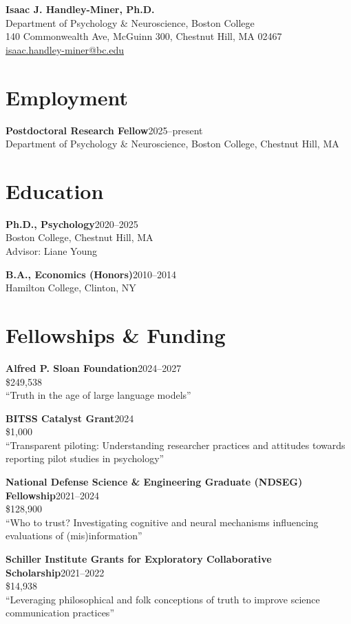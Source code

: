 \documentclass[11pt, letterpaper]{article}
\newcommand{\cventry}[3]{%
    \textbf{#1}\hfill #2\\
    {\color{mutedgray}#3}\par\vspace{0.3em}%
}
\newcommand{\cventrynote}[4]{%
    \textbf{#1}\hfill #2\\
    {\color{mutedgray}#3}\\
    {\small\color{mutedgray}#4}\par\vspace{0.3em}%
}
\begin{document}
\begin{center}
    {\LARGE\bfseries Isaac J. Handley-Miner, Ph.D.}\\[0.4em]
    {\color{mutedgray}
    Department of Psychology \& Neuroscience, Boston College\\
    140 Commonwealth Ave, McGuinn 300, Chestnut Hill, MA 02467\\[0.2em]
    \href{mailto:isaac.handley-miner@bc.edu}{isaac.handley-miner@bc.edu}}
\end{center}

\section{Employment}

\cventry{Postdoctoral Research Fellow}{2025--present}
    {Department of Psychology \& Neuroscience, Boston College, Chestnut Hill, MA}

\section{Education}

\cventrynote{Ph.D., Psychology}{2020--2025}
    {Boston College, Chestnut Hill, MA}
    {Advisor: Liane Young}

\cventry{B.A., Economics (Honors)}{2010--2014}
    {Hamilton College, Clinton, NY}

\section{Fellowships \& Funding}

\cventrynote{Alfred P. Sloan Foundation}{2024--2027}
    {\$249,538}
    {``Truth in the age of large language models''}

\cventrynote{BITSS Catalyst Grant}{2024}
    {\$1,000}
    {``Transparent piloting: Understanding researcher practices and attitudes towards reporting pilot studies in psychology''}

\cventrynote{National Defense Science \& Engineering Graduate (NDSEG) Fellowship}{2021--2024}
    {\$128,900}
    {``Who to trust? Investigating cognitive and neural mechanisms influencing evaluations of (mis)information''}

\cventrynote{Schiller Institute Grants for Exploratory Collaborative Scholarship}{2021--2022}
    {\$14,938}
    {``Leveraging philosophical and folk conceptions of truth to improve science communication practices''}
\end{document}
